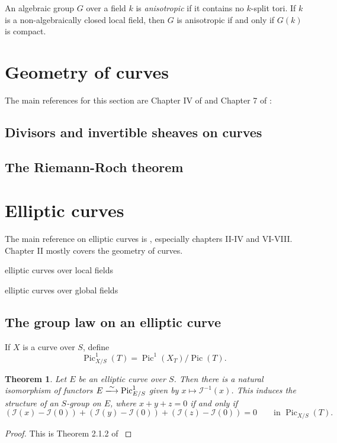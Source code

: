 \documentclass{article}
\DeclareMathOperator{\picard}{Pic}
\newcommand{\sI}{\mathscr{I}}
\newcommand{\isomorphism}{\xlongrightarrow{\sim}}
\newtheorem{theorem}[subsubsection]{Theorem}
\theoremstyle{definition}
\begin{document}
An algebraic group $G$ over a field $k$ is \emph{anisotropic} if it contains 
no $k$-split tori. If $k$ is a non-algebraically closed local field, then $G$ 
is anisotropic if and only if $G(k)$ is compact. 





\section{Geometry of curves}

The main references for this section are Chapter IV of \cite{ha77} and Chapter 
7 of \cite{li02}:


\subsection{Divisors and invertible sheaves on curves}


\subsection{The Riemann-Roch theorem}





\section{Elliptic curves}

The main reference on elliptic curves is \cite{si09}, especially chapters 
II-IV and VI-VIII. Chapter II mostly covers the geometry of curves. 

elliptic curves over local fields

elliptic curves over global fields


\subsection{The group law on an elliptic curve}

If $X$ is a curve over $S$, define 
\[
  \picard_{X/S}^1(T) = \picard^1(X_T) / \picard(T) .
\]

\begin{theorem}
Let $E$ be an elliptic curve over $S$. Then there is a natural isomorphism 
of functors $E\isomorphism \picard_{E/S}^1$ given by $x\mapsto \sI^{-1}(x)$. 
This induces the structure of an $S$-group on $E$, where $x+y+z=0$ if and only 
if 
\[
  (\sI(x) - \sI(0)) + (\sI(y) - \sI(0)) + (\sI(z) - \sI(0)) = 0\qquad \text{in } \picard_{X/S}(T) . 
\]
\end{theorem}
\begin{proof}
This is Theorem 2.1.2 of \cite{km85}
\end{proof}
\end{document}
